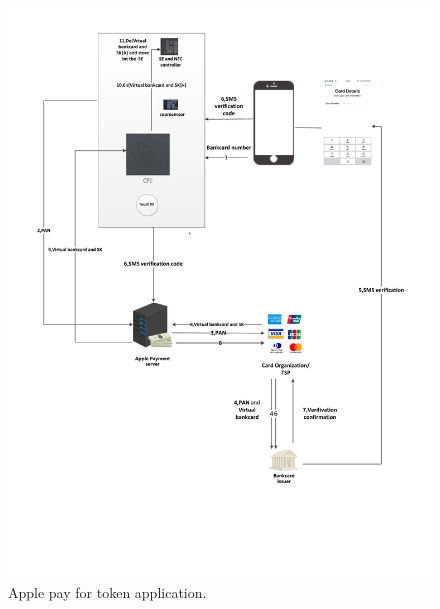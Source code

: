 \documentclass[journal]{IEEEtran}
\begin{document}
\begin{figure}[htbp]
\centerline{\includegraphics[scale=0.6]{iphone_tsp.pdf}}
\caption{Apple pay for token application.}
\label{fig}
\end{figure}
\end{document}
